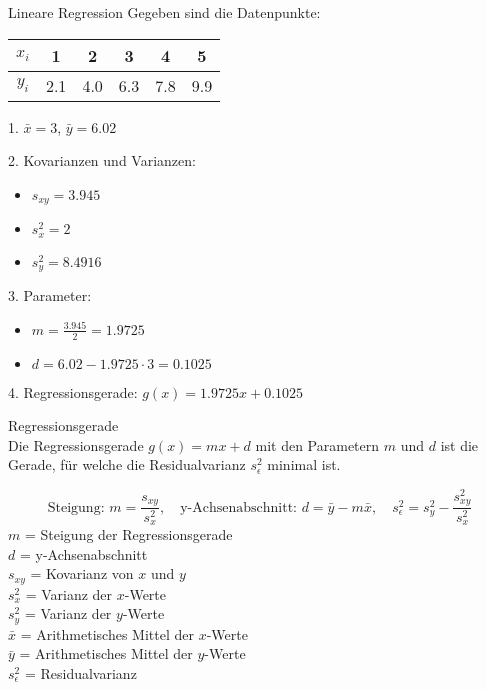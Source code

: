 \begin{example2}{Lineare Regression}
Gegeben sind die Datenpunkte:
\begin{center}
\begin{tabular}{|c|c|c|c|c|c|}
\hline
$x_i$ & 1 & 2 & 3 & 4 & 5 \\
\hline
$y_i$ & 2.1 & 4.0 & 6.3 & 7.8 & 9.9 \\
\hline
\end{tabular}
\end{center}

1. $\bar{x} = 3$, $\bar{y} = 6.02$

2. Kovarianzen und Varianzen:
   \begin{itemize}
     \item $s_{xy} = 3.945$
     \item $s_x^2 = 2$
     \item $s_y^2 = 8.4916$
   \end{itemize}

3. Parameter:
   \begin{itemize}
     \item $m = \frac{3.945}{2} = 1.9725$
     \item $d = 6.02 - 1.9725 \cdot 3 = 0.1025$
   \end{itemize}

4. Regressionsgerade: $g(x) = 1.9725x + 0.1025$
\end{example2}

\begin{theorem}{Regressionsgerade}\\
Die Regressionsgerade $g(x)=mx+d$ mit den Parametern $m$ und $d$ ist die Gerade, für welche die Residualvarianz $s_{\epsilon}^2$ minimal ist.

$$
\text{Steigung: } m=\frac{s_{xy}}{s_x^2}, \quad \text{y-Achsenabschnitt: } d=\bar{y}-m\bar{x}, \quad s_{\epsilon}^2=s_y^2-\frac{s_{xy}^2}{s_x^2}
$$
$m$ = Steigung der Regressionsgerade\\
$d$ = y-Achsenabschnitt\\
$s_{xy}$ = Kovarianz von $x$ und $y$\\
$s_x^2$ = Varianz der $x$-Werte\\
$s_y^2$ = Varianz der $y$-Werte\\
$\bar{x}$ = Arithmetisches Mittel der $x$-Werte\\
$\bar{y}$ = Arithmetisches Mittel der $y$-Werte\\
$s_{\epsilon}^2$ = Residualvarianz\\
\end{theorem}


